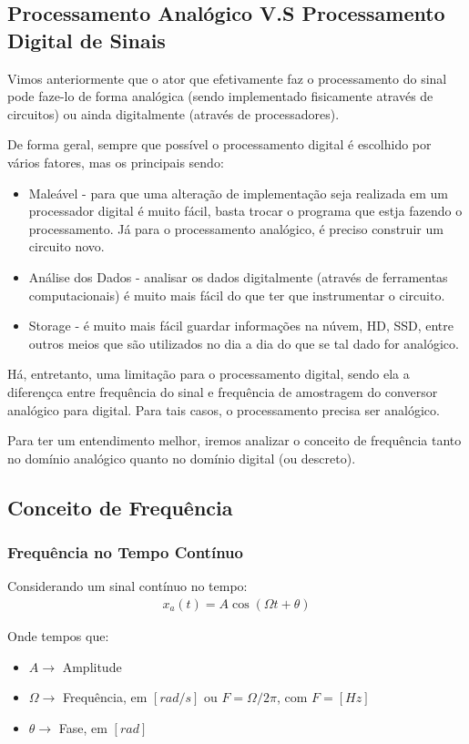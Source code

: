\documentclass{article}
\begin{document}
\subsection{Processamento Analógico V.S Processamento Digital de Sinais}
Vimos anteriormente que o ator que efetivamente faz o processamento do sinal pode faze-lo de forma analógica (sendo implementado fisicamente através de circuitos) ou ainda digitalmente (através de processadores). 

De forma geral, sempre que possível o processamento digital é escolhido por vários fatores, mas os principais sendo:
\begin{itemize}
    \item Maleável - para que uma alteração de implementação seja realizada em um processador digital é muito fácil, basta trocar o programa que estja fazendo o processamento. Já para o processamento analógico, é preciso construir um circuito novo.
    \item Análise dos Dados - analisar os dados digitalmente (através de ferramentas computacionais) é muito mais fácil do que ter que instrumentar o circuito. 
    \item Storage - é muito mais fácil guardar informações na núvem, HD, SSD, entre outros meios que são utilizados no dia a dia do que se tal dado for analógico.
\end{itemize}

Há, entretanto, uma limitação para o processamento digital, sendo ela a diferençca entre frequência do sinal e frequência de amostragem do conversor analógico para digital. Para tais casos, o processamento precisa ser analógico. 

Para ter um entendimento melhor, iremos analizar o conceito de frequência tanto no domínio analógico quanto no domínio digital (ou descreto).
\newpage
\subsection{Conceito de Frequência}
\subsubsection{Frequência no Tempo Contínuo}
Considerando um sinal contínuo no tempo:
\begin{align*}
    x_a(t) = A\cos(\Omega t + \theta)
\end{align*}

Onde tempos que:
\begin{itemize}
    \item $A\rightarrow$ Amplitude
    \item $\Omega\rightarrow$ Frequência, em $[rad/s]$ ou $F = \Omega/2\pi$, com $F = [Hz]$
    \item $\theta\rightarrow$ Fase, em $[rad]$
\end{itemize}
\end{document}
